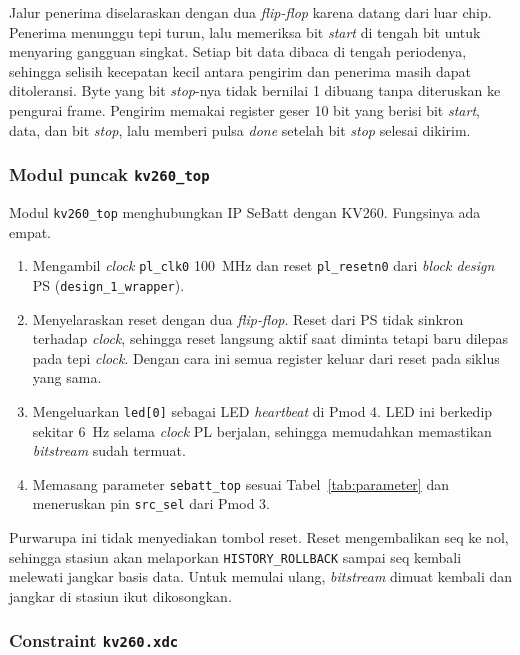 \documentclass[11pt,a4paper]{article}
\begin{document}
Jalur penerima diselaraskan dengan dua \textit{flip-flop} karena datang dari luar chip. Penerima
menunggu tepi turun, lalu memeriksa bit \textit{start} di tengah bit untuk menyaring gangguan
singkat. Setiap bit data dibaca di tengah periodenya, sehingga selisih kecepatan kecil antara
pengirim dan penerima masih dapat ditoleransi. Byte yang bit \textit{stop}-nya tidak bernilai 1
dibuang tanpa diteruskan ke pengurai frame. Pengirim memakai register geser 10 bit yang berisi bit
\textit{start}, data, dan bit \textit{stop}, lalu memberi pulsa \textit{done} setelah bit
\textit{stop} selesai dikirim.

\subsubsection*{Modul puncak \texttt{kv260\_top}}

Modul \texttt{kv260\_top} menghubungkan IP SeBatt dengan KV260. Fungsinya ada empat.
\begin{enumerate}
  \item Mengambil \textit{clock} \texttt{pl\_clk0} 100~MHz dan reset \texttt{pl\_resetn0} dari
    \textit{block design} PS (\texttt{design\_1\_wrapper}).
  \item Menyelaraskan reset dengan dua \textit{flip-flop}. Reset dari PS tidak sinkron terhadap
    \textit{clock}, sehingga reset langsung aktif saat diminta tetapi baru dilepas pada tepi
    \textit{clock}. Dengan cara ini semua register keluar dari reset pada siklus yang sama.
  \item Mengeluarkan \texttt{led[0]} sebagai LED \textit{heartbeat} di Pmod 4. LED ini berkedip
    sekitar 6~Hz selama \textit{clock} PL berjalan, sehingga memudahkan memastikan
    \textit{bitstream} sudah termuat.
  \item Memasang parameter \texttt{sebatt\_top} sesuai Tabel~\ref{tab:parameter} dan meneruskan pin
    \texttt{src\_sel} dari Pmod 3.
\end{enumerate}
Purwarupa ini tidak menyediakan tombol reset. Reset mengembalikan seq ke nol, sehingga stasiun akan
melaporkan \texttt{HISTORY\_ROLLBACK} sampai seq kembali melewati jangkar basis data. Untuk memulai
ulang, \textit{bitstream} dimuat kembali dan jangkar di stasiun ikut dikosongkan.

\subsubsection*{Constraint \texttt{kv260.xdc}}
\end{document}
